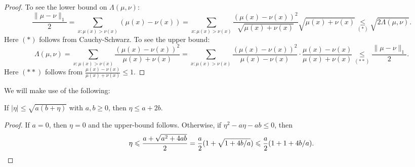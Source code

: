 \documentclass[11pt,letterpaper]{article}
\renewcommand{\geq}{\geqslant}
\renewcommand{\leq}{\leqslant}
\renewcommand{\le}{\leq}
\theoremstyle{definition}
\begin{document}
\lambdatvd*

\begin{proof}
To see the lower bound on $\Lambda(\mu, \nu)$:
\[
\frac{\|\mu - \nu\|_1} 2 = \sum_{x: \mu(x) > \nu(x)} (\mu(x) - \nu(x)) =  \sum_{x: \mu(x) > \nu(x)} \frac{(\mu(x) - \nu(x))^2}{\sqrt{\mu(x) + \nu(x)}} \sqrt{\mu(x) + \nu(x)} \underset{(*)}{\leq} \sqrt{2\Lambda(\mu, \nu)}.
\]
Here $(*)$ follows from Cauchy-Schwarz. To see the upper bound:
\[
\Lambda(\mu, \nu) = \sum_{x: \mu(x) > \nu(x)}\frac{(\mu(x) - \nu(x))^2}{\mu(x) + \nu(x)} = \sum_{x: \mu(x) > \nu(x)}\frac{(\mu(x) - \nu(x))^2}{\mu(x) - \nu(x)} \cdot \frac{\mu(x) - \nu(x)}{\mu(x) + \nu(x)} \underset{(**)}{\leq} \frac{\|\mu - \nu\|_1} 2.
\]
Here $(**)$ follows from $\frac{\mu(x) - \nu(x)}{\mu(x) + \nu(x)}\leq 1$.

\end{proof}

We will make use of the following:

\begin{proposition}
\label{fact:trick1}
If $|\eta| \leq \sqrt{a(b+ \eta)}$ with $a,b\geq 0$, then $\eta \leq a + 2b$.
\end{proposition}

\begin{proof}
    If $a = 0$, then $\eta = 0$ and the upper-bound follows. Otherwise, if $\eta^2 - a \eta - a b \le 0$, then
    \[
    \eta \le \frac{a + \sqrt{a^2 + 4 a b}}{2} = \frac{a}{2} (1 + \sqrt{1 + 4 b/a}) \le \frac{a}{2}(1 + 1 + 4 b/a). \qedhere
    \]
\end{proof}

\lambdaloss*
\end{document}
